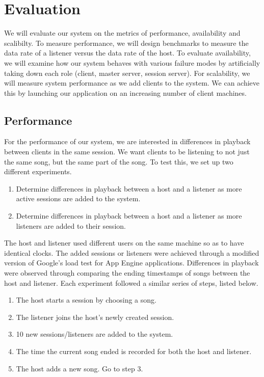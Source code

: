 \section{Evaluation}
\label{sec:eval}
We will evaluate our system on the metrics of performance, 
availability and scalibilty. To measure performance, 
we will design benchmarks to measure the data rate 
of a listener versus the data rate of the host. To 
evaluate availability, we will examine how our system 
behaves with various failure modes by artificially 
taking down each role (client, master server, session 
server). For scalability, we will measure system 
performance as we add clients to the system. We can 
achieve this by launching our application on an 
increasing number of client machines.

\subsection{Performance}

For the performance of our system, we are interested in differences in playback between clients in the same session. We want clients to be listening to not just the same song, but the same part of the song. To test this, we set up two different experiments.

\begin{enumerate}

\item Determine differences in playback between a host and a listener as more active sessions are added to the system.

\item Determine differences in playback between a host and a listener as more listeners are added to their session.

\end{enumerate}

The host and listener used different users on the same machine so as to have identical clocks. The added sessions or listeners were achieved through a modified version of Google's load test for App Engine applications. Differences in playback were observed through comparing the ending timestamps of songs between the host and listener. Each experiment followed a similar series of steps, listed below.

\begin{enumerate}

\item The host starts a session by choosing a song.

\item The listener joins the host's newly created session.

\item 10 new sessions/listeners are added to the system.

\item The time the current song ended is recorded for both the host and listener.

\item The host adds a new song. Go to step 3.

\end{enumerate}

